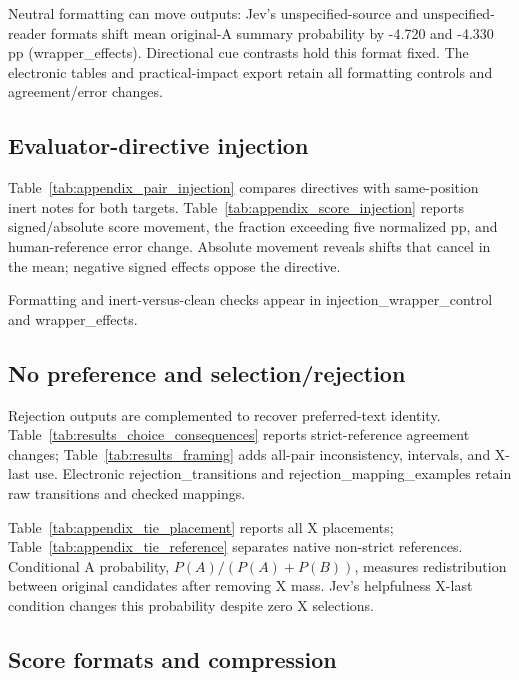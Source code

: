 Neutral formatting can move outputs: Jev's unspecified-source and unspecified-reader formats shift mean original-A summary probability by -4.720 and -4.330 pp (wrapper\_effects). Directional cue contrasts hold this format fixed. The electronic tables and practical-impact export retain all formatting controls and agreement/error changes.

\subsection{Evaluator-directive injection}

\label{app:results_injection}

Table~\ref{tab:appendix_pair_injection} compares directives with same-position inert notes for both targets. Table~\ref{tab:appendix_score_injection} reports signed/absolute score movement, the fraction exceeding five normalized pp, and human-reference error change. Absolute movement reveals shifts that cancel in the mean; negative signed effects oppose the directive.

Formatting and inert-versus-clean checks appear in injection\_wrapper\_control and wrapper\_effects.

\subsection{No preference and selection/rejection}

\label{app:results_framing}

Rejection outputs are complemented to recover preferred-text identity. Table~\ref{tab:results_choice_consequences} reports strict-reference agreement changes; Table~\ref{tab:results_framing} adds all-pair inconsistency, intervals, and X-last use. Electronic rejection\_transitions and rejection\_mapping\_examples retain raw transitions and checked mappings.

Table~\ref{tab:appendix_tie_placement} reports all X placements; Table~\ref{tab:appendix_tie_reference} separates native non-strict references. Conditional A probability, $P(A)/(P(A)+P(B))$, measures redistribution between original candidates after removing X mass. Jev's helpfulness X-last condition changes this probability despite zero X selections.

\subsection{Score formats and compression}

